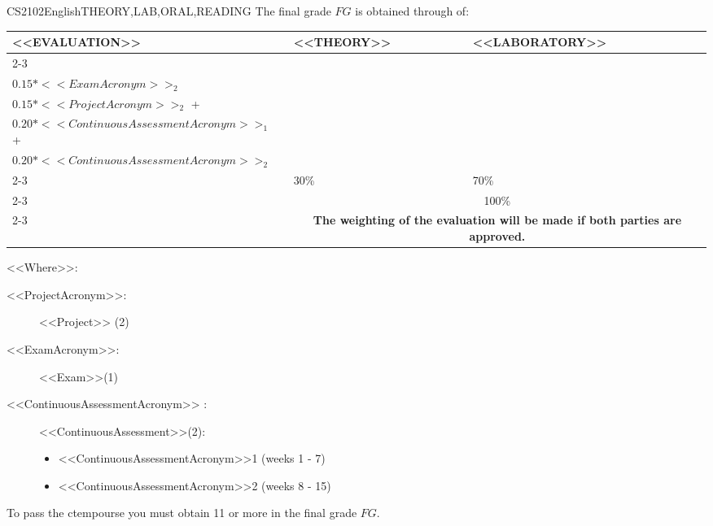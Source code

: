   \begin{evaluation}{CS2102}{English}{THEORY,LAB,ORAL,READING}
  The final grade $FG$ is obtained through of:
 
  \begin{tabularx}{0.9\textwidth}{|X|p{}|p{}|} \hline
  \multirow{4}{*}{\uppercase{<<Evaluation>>}} & \uppercase{<<Theory>>} & \uppercase{<<Laboratory>>} \\ \cline{2-3}
  & %
      \begin{minipage}{0.95\textwidth}
      \begin{tabular}{l}
          $0.15*<<ExamAcronym>>_{1}$ + \\  
          $0.15*<<ExamAcronym>>_{2}$ 
      \end{tabular} 
      \end{minipage} 
  & %
      \begin{minipage}{0.95\textwidth}
      \begin{tabular}{l}
          $0.15*<<ProjectAcronym>>_{1}$ + \\
          $0.15*<<ProjectAcronym>>_{2}$ + \\
          $0.20*<<ContinuousAssessmentAcronym>>_{1}$ + \\
          $0.20*<<ContinuousAssessmentAcronym>>_{2}$
          \end{tabular} 
      \end{minipage}                 \\ \cline{2-3}
  
  & %
  30\% 
  & %
  70\% \\ \cline{2-3}
  & \multicolumn{2}{c|}{100\%}  \\ \cline{2-3}
  & \multicolumn{2}{c|}{\textbf{The weighting of the evaluation will be made if both parties are approved.}}  \\ \hline
  \end{tabularx}
  
  \vspace{2mm}
  \noindent <<Where>>:
  \begin{description}
    \item[<<ProjectAcronym>>:] <<Project>> (2)  
    \item[<<ExamAcronym>>:] <<Exam>>(1) 
    \item[<<ContinuousAssessmentAcronym>> :] <<ContinuousAssessment>>(2):
      \begin{itemize}
            \item  <<ContinuousAssessmentAcronym>>1 (weeks 1 - 7) 
            \item <<ContinuousAssessmentAcronym>>2 (weeks 8 - 15) 
      \end{itemize}
  \end{description}

  \noindent To pass the ctempourse you must obtain 11 or more in the final grade $FG$.
  \end{evaluation}


